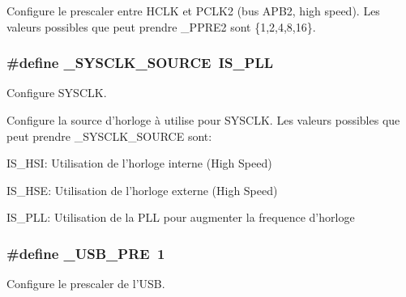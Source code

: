 Configure le prescaler entre H\+C\+L\+K et P\+C\+L\+K2 (bus A\+P\+B2, high speed). Les valeurs possibles que peut prendre \+\_\+\+P\+P\+R\+E2 sont \{1,2,4,8,16\}. \hypertarget{group__conf___c_l_o_c_k_gad975c0a22cc8515304e7cbe6e489ddcd}{
\subsubsection[{\+\_\+\+S\+Y\+S\+C\+L\+K\+\_\+\+S\+O\+U\+R\+C\+E}]{\setlength{\rightskip}{0pt plus 5cm}\#define \+\_\+\+S\+Y\+S\+C\+L\+K\+\_\+\+S\+O\+U\+R\+C\+E~{\bf I\+S\+\_\+\+P\+L\+L}}}\label{group__conf___c_l_o_c_k_gad975c0a22cc8515304e7cbe6e489ddcd}


Configure S\+Y\+S\+C\+L\+K. 

Configure la source d'horloge à utilise pour S\+Y\+S\+C\+L\+K. Les valeurs possibles que peut prendre \+\_\+\+S\+Y\+S\+C\+L\+K\+\_\+\+S\+O\+U\+R\+C\+E sont\+:
\begin{DoxyItemize}
\item I\+S\+\_\+\+H\+S\+I\+: Utilisation de l'horloge interne (High Speed)
\item I\+S\+\_\+\+H\+S\+E\+: Utilisation de l'horloge externe (High Speed)
\item I\+S\+\_\+\+P\+L\+L\+: Utilisation de la P\+L\+L pour augmenter la frequence d'horloge 
\end{DoxyItemize}\hypertarget{group__conf___c_l_o_c_k_gad730e10b5d236a647c9e999e72d0e895}{
\subsubsection[{\+\_\+\+U\+S\+B\+\_\+\+P\+R\+E}]{\setlength{\rightskip}{0pt plus 5cm}\#define \+\_\+\+U\+S\+B\+\_\+\+P\+R\+E~1}}\label{group__conf___c_l_o_c_k_gad730e10b5d236a647c9e999e72d0e895}


Configure le prescaler de l'U\+S\+B. 

